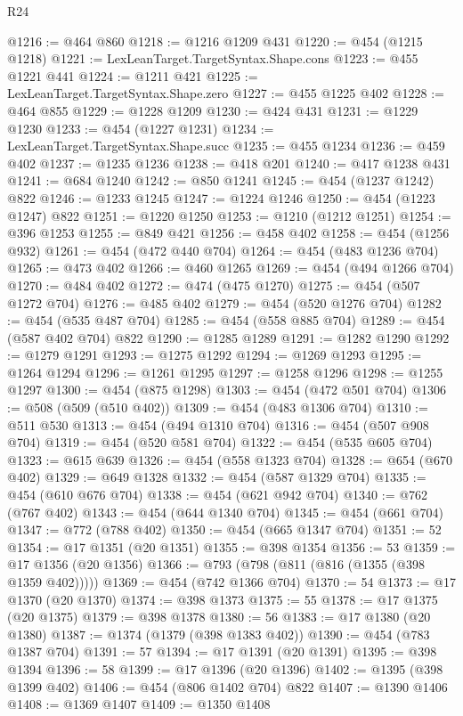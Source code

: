 \begin{lexlean}{R24}
\begin{coremodule}
@1216 := @464 @860
@1218 := @1216 @1209 @431
@1220 := @454 (@1215 @1218)
@1221 := LexLeanTarget.TargetSyntax.Shape.cons
@1223 := @455 @1221 @441
@1224 := @1211 @421
@1225 := LexLeanTarget.TargetSyntax.Shape.zero
@1227 := @455 @1225 @402
@1228 := @464 @855
@1229 := @1228 @1209
@1230 := @424 @431
@1231 := @1229 @1230
@1233 := @454 (@1227 @1231)
@1234 := LexLeanTarget.TargetSyntax.Shape.succ
@1235 := @455 @1234
@1236 := @459 @402
@1237 := @1235 @1236
@1238 := @418 @201
@1240 := @417 @1238 @431
@1241 := @684 @1240
@1242 := @850 @1241
@1245 := @454 (@1237 @1242) @822
@1246 := @1233 @1245
@1247 := @1224 @1246
@1250 := @454 (@1223 @1247) @822
@1251 := @1220 @1250
@1253 := @1210 (@1212 @1251)
@1254 := @396 @1253
@1255 := @849 @421
@1256 := @458 @402
@1258 := @454 (@1256 @932)
@1261 := @454 (@472 @440 @704)
@1264 := @454 (@483 @1236 @704)
@1265 := @473 @402
@1266 := @460 @1265
@1269 := @454 (@494 @1266 @704)
@1270 := @484 @402
@1272 := @474 (@475 @1270)
@1275 := @454 (@507 @1272 @704)
@1276 := @485 @402
@1279 := @454 (@520 @1276 @704)
@1282 := @454 (@535 @487 @704)
@1285 := @454 (@558 @885 @704)
@1289 := @454 (@587 @402 @704) @822
@1290 := @1285 @1289
@1291 := @1282 @1290
@1292 := @1279 @1291
@1293 := @1275 @1292
@1294 := @1269 @1293
@1295 := @1264 @1294
@1296 := @1261 @1295
@1297 := @1258 @1296
@1298 := @1255 @1297
@1300 := @454 (@875 @1298)
@1303 := @454 (@472 @501 @704)
@1306 := @508 (@509 (@510 @402))
@1309 := @454 (@483 @1306 @704)
@1310 := @511 @530
@1313 := @454 (@494 @1310 @704)
@1316 := @454 (@507 @908 @704)
@1319 := @454 (@520 @581 @704)
@1322 := @454 (@535 @605 @704)
@1323 := @615 @639
@1326 := @454 (@558 @1323 @704)
@1328 := @654 (@670 @402)
@1329 := @649 @1328
@1332 := @454 (@587 @1329 @704)
@1335 := @454 (@610 @676 @704)
@1338 := @454 (@621 @942 @704)
@1340 := @762 (@767 @402)
@1343 := @454 (@644 @1340 @704)
@1345 := @454 (@661 @704)
@1347 := @772 (@788 @402)
@1350 := @454 (@665 @1347 @704)
@1351 := 52
@1354 := @17 @1351 (@20 @1351)
@1355 := @398 @1354
@1356 := 53
@1359 := @17 @1356 (@20 @1356)
@1366 := @793 (@798 (@811 (@816 (@1355 (@398 @1359 @402)))))
@1369 := @454 (@742 @1366 @704)
@1370 := 54
@1373 := @17 @1370 (@20 @1370)
@1374 := @398 @1373
@1375 := 55
@1378 := @17 @1375 (@20 @1375)
@1379 := @398 @1378
@1380 := 56
@1383 := @17 @1380 (@20 @1380)
@1387 := @1374 (@1379 (@398 @1383 @402))
@1390 := @454 (@783 @1387 @704)
@1391 := 57
@1394 := @17 @1391 (@20 @1391)
@1395 := @398 @1394
@1396 := 58
@1399 := @17 @1396 (@20 @1396)
@1402 := @1395 (@398 @1399 @402)
@1406 := @454 (@806 @1402 @704) @822
@1407 := @1390 @1406
@1408 := @1369 @1407
@1409 := @1350 @1408

\end{coremodule}
\end{lexlean}
